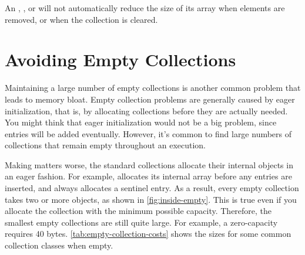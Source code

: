 An , , or 
will not automatically reduce the size of its array when elements are removed,
or when the collection is cleared.

  

\section{Avoiding Empty Collections}

Maintaining a large number of empty collections is another common problem that
leads to memory bloat. Empty collection problems are generally caused by eager
initialization, that is, by allocating collections before they are actually
needed. You might think that eager initialization would not be a big
problem, since entries will be added eventually. However, it's common to
find large numbers of collections that remain empty throughout an execution.

Making matters worse, the standard collections
allocate their internal objects in an eager fashion. For example,
 allocates its internal array before any
entries are inserted, and  always allocates a sentinel
entry. As a result, every empty collection takes two or more objects, as shown
in \autoref{fig:inside-empty}.
This is true even if you allocate the collection with the minimum possible
capacity.
Therefore, the smallest empty collections are still quite large. For example,
a zero-capacity  requires 40 bytes.
\autoref{tab:empty-collection-costs} shows the sizes for some common collection classes
when empty. 




